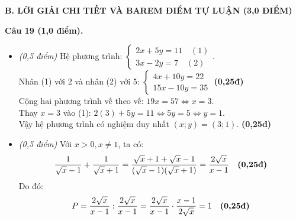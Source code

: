 \documentclass[11pt,a4paper]{article}
\begin{document}
\vspace{3mm}
\noindent
\textbf{\large B. LỜI GIẢI CHI TIẾT VÀ BAREM ĐIỂM TỰ LUẬN (3,0 ĐIỂM)}

\vspace{2mm}
\noindent
\textbf{Câu 19 (1,0 điểm).}
\begin{itemize}
  \item[a)] \textit{(0,5 điểm)} Hệ phương trình: $\begin{cases} 2x + 5y = 11 \quad (1) \\ 3x - 2y = 7 \quad (2) \end{cases}$.\\
  Nhân (1) với 2 và nhân (2) với 5: $\begin{cases} 4x + 10y = 22 \\ 15x - 10y = 35 \end{cases}$ \dotfill \textbf{(0,25đ)}\\
  Cộng hai phương trình vế theo vế: $19x = 57 \iff x = 3$.\\
  Thay $x = 3$ vào (1): $2(3) + 5y = 11 \iff 5y = 5 \iff y = 1$.\\
  Vậy hệ phương trình có nghiệm duy nhất $(x; y) = (3; 1)$. \dotfill \textbf{(0,25đ)}

  \item[b)] \textit{(0,5 điểm)} Với $x > 0, x \ne 1$, ta có:
  \[
  \dfrac{1}{\sqrt{x}-1} + \dfrac{1}{\sqrt{x}+1} = \dfrac{\sqrt{x}+1 + \sqrt{x}-1}{(\sqrt{x}-1)(\sqrt{x}+1)} = \dfrac{2\sqrt{x}}{x-1} \quad \text{\textbf{(0,25đ)}}
  \]
  Do đó:
  \[
  P = \dfrac{2\sqrt{x}}{x-1} : \dfrac{2\sqrt{x}}{x-1} = \dfrac{2\sqrt{x}}{x-1} \cdot \dfrac{x-1}{2\sqrt{x}} = 1 \quad \text{\textbf{(0,25đ)}}
  \]
\end{itemize}
\end{document}
